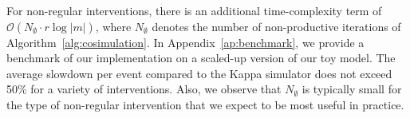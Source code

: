 
For non-regular interventions, there is an additional time-complexity
term of $\mathcal{O}(N_\emptyset \cdot r\log|m|)$, where $N_\emptyset$
denotes the number of non-productive iterations of
Algorithm~\ref{alg:cosimulation}. In Appendix~\ref{ap:benchmark}, we
provide a benchmark of our implementation on a scaled-up version of
our toy model. The average slowdown per event compared to the
Kappa simulator does not exceed 50\% for a variety of
interventions. Also, we observe that $N_\emptyset$ is typically small
for the type of non-regular intervention that we expect to be most
useful in practice.

\medskip